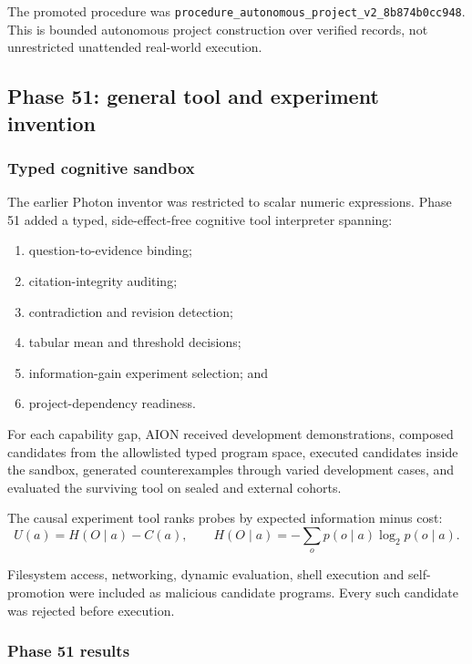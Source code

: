 The promoted procedure was
\texttt{procedure\_autonomous\_project\_v2\_8b874b0cc948}.
This is bounded autonomous project construction over verified records, not
unrestricted unattended real-world execution.

\subsection{Phase 51: general tool and experiment invention}
\label{subsec:phase51-tool-invention}

\subsubsection{Typed cognitive sandbox}

The earlier Photon inventor was restricted to scalar numeric expressions.
Phase 51 added a typed, side-effect-free cognitive tool interpreter spanning:
\begin{enumerate}
    \item question-to-evidence binding;
    \item citation-integrity auditing;
    \item contradiction and revision detection;
    \item tabular mean and threshold decisions;
    \item information-gain experiment selection; and
    \item project-dependency readiness.
\end{enumerate}

For each capability gap, AION received development demonstrations, composed
candidates from the allowlisted typed program space, executed candidates
inside the sandbox, generated counterexamples through varied development
cases, and evaluated the surviving tool on sealed and external cohorts.

The causal experiment tool ranks probes by expected information minus cost:
\[
U(a)=H(O\mid a)-C(a),
\qquad
H(O\mid a)=-\sum_o p(o\mid a)\log_2 p(o\mid a).
\]

Filesystem access, networking, dynamic evaluation, shell execution and
self-promotion were included as malicious candidate programs.  Every such
candidate was rejected before execution.

\subsubsection{Phase 51 results}

